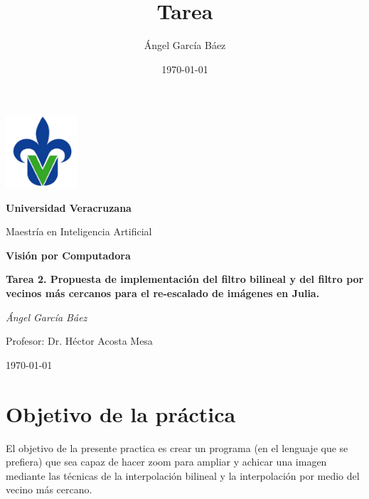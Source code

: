 \documentclass[11pt, letterpaper]{article}
\title{\bfseries Tarea}
\author{Ángel García Báez}
\date{\today}
\begin{document}
	
	\begin{titlepage}
		\centering
		\includegraphics[width=0.2\textwidth]{logo.png}\par
		\vspace{1cm}
		{\LARGE \bfseries Universidad Veracruzana \par}
		\vspace{1cm}
		{\Large Maestría en Inteligencia Artificial\par}
		\vspace{3cm}
		{\LARGE \bfseries Visión por Computadora \par}
		\vspace{1cm}
		{\Large \bfseries Tarea 2. Propuesta de implementación del filtro bilineal y del filtro por vecinos más cercanos para el re-escalado de imágenes en Julia. \par}
		\vfill
		{\Large \textit{Ángel García Báez}\par}
		\vspace{1cm}
		{\Large Profesor: Dr. Héctor Acosta Mesa\par}
		\vfill
		{\Large \today \par}
	\end{titlepage}
	
	\newpage
	\tableofcontents
	\newpage
	
	\section{Objetivo de la práctica}
	
	El objetivo de la presente practica es crear un programa (en el lenguaje que se prefiera) que sea capaz de hacer zoom para ampliar y achicar una imagen mediante las técnicas de la interpolación bilineal y la interpolación por medio del vecino más cercano.
			
\end{document}
